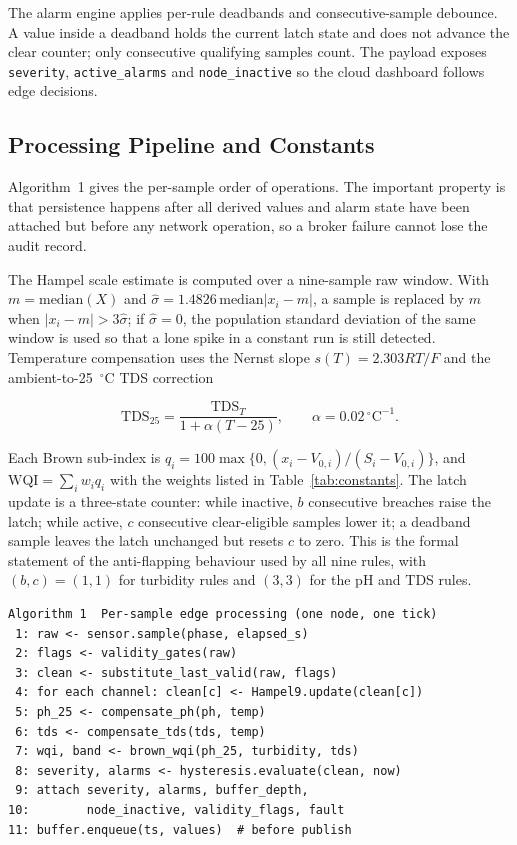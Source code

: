 \documentclass[conference]{IEEEtran}
\begin{document}
The alarm engine applies per-rule deadbands and consecutive-sample debounce.
A value inside a deadband holds the current latch state and does not advance the
clear counter; only consecutive qualifying samples count. The payload exposes
\texttt{severity}, \texttt{active\_alarms} and \texttt{node\_inactive} so the
cloud dashboard follows edge decisions.

\subsection{Processing Pipeline and Constants}

Algorithm~1 gives the per-sample order of operations. The important property is
that persistence happens after all derived values and alarm state have been
attached but before any network operation, so a broker failure cannot lose the
audit record.

The Hampel scale estimate is computed over a nine-sample raw window. With
$m=\mathrm{median}(X)$ and $\hat{\sigma}=1.4826\,\mathrm{median}|x_i-m|$, a sample is
replaced by $m$ when $|x_i-m|>3\hat{\sigma}$; if $\hat{\sigma}=0$, the population
standard deviation of the same window is used so that a lone spike in a constant
run is still detected. Temperature compensation uses the Nernst slope
$s(T)=2.303RT/F$ and the ambient-to-25~$^\circ$C TDS correction

\begin{equation}
\mathrm{TDS}_{25}=\frac{\mathrm{TDS}_{T}}{1+\alpha(T-25)},\qquad \alpha=0.02\,^\circ\mathrm{C}^{-1}.
\end{equation}

Each Brown sub-index is $q_i=100\max\{0,(x_i-V_{0,i})/(S_i-V_{0,i})\}$, and
$\mathrm{WQI}=\sum_i w_iq_i$ with the weights listed in Table~\ref{tab:constants}.
The latch update is a three-state counter: while inactive, $b$ consecutive
breaches raise the latch; while active, $c$ consecutive clear-eligible samples
lower it; a deadband sample leaves the latch unchanged but resets $c$ to zero.
This is the formal statement of the anti-flapping behaviour used by all nine
rules, with $(b,c)=(1,1)$ for turbidity rules and $(3,3)$ for the pH and TDS
rules.

{\scriptsize
\begin{verbatim}
Algorithm 1  Per-sample edge processing (one node, one tick)
 1: raw <- sensor.sample(phase, elapsed_s)
 2: flags <- validity_gates(raw)
 3: clean <- substitute_last_valid(raw, flags)
 4: for each channel: clean[c] <- Hampel9.update(clean[c])
 5: ph_25 <- compensate_ph(ph, temp)
 6: tds <- compensate_tds(tds, temp)
 7: wqi, band <- brown_wqi(ph_25, turbidity, tds)
 8: severity, alarms <- hysteresis.evaluate(clean, now)
 9: attach severity, alarms, buffer_depth,
10:        node_inactive, validity_flags, fault
11: buffer.enqueue(ts, values)  # before publish
\end{verbatim}
}
\end{document}

